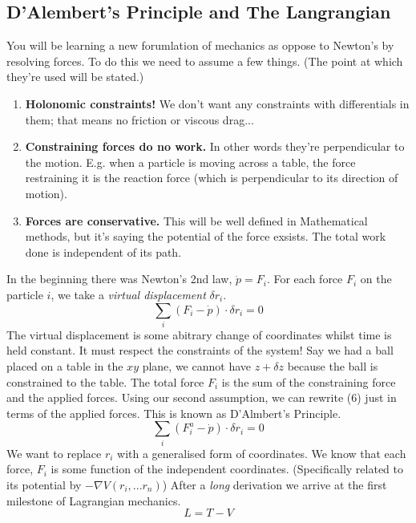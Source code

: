 \subsection{D'Alembert's Principle and The Langrangian}
You will be learning a new forumlation of mechanics as oppose to Newton's by resolving forces. To do this we need to assume a few things. (The point at which they're used will be stated.)
\begin{enumerate}
\item \textbf{Holonomic constraints!} We don't want any constraints with differentials in them; that means no friction or viscous drag...
\item \textbf{Constraining forces do no work.} In other words they're perpendicular to the motion. E.g. when a particle is moving across a table, the force restraining it is the reaction force (which is perpendicular to its direction of motion).
\item \textbf{Forces are conservative.} This will be well defined in Mathematical methods, but it's saying the potential of the force exsists. The total work done is independent of its path.
\end{enumerate}
\par 
In the beginning there was Newton's 2nd law, $\dot{p} = F_{i}$. For each force $F_{i}$ on the particle $i$, we take a \textit{virtual displacement} $\delta r_{i}$. 
\begin{equation}
\sum_{i} (F_{i} - \dot{p}) \cdot \delta r_{i} = 0
\end{equation}
The virtual displacement is some abitrary change of coordinates whilst time is held constant. It must respect the constraints of the system! Say we had a ball placed on a table in the $xy$ plane, we cannot have $z + \delta z$ because the ball is constrained to the table. The total force $F_{i}$ is the sum of the constraining force and the applied forces. Using our second assumption, we can rewrite (6) just in terms of the applied forces. This is known as D'Almbert's Principle.
\begin{equation}
\sum_{i} (F_{i}^{a} - \dot{p}) \cdot \delta r_{i} = 0
\end{equation}
We want to replace $r_{i}$ with a generalised form of coordinates. We know that each force, $F_{i}$ is some function of the independent coordinates. (Specifically related to its potential by $-\nabla V(r_{i}, ... r_{n})$)
After a \textit{long} derivation we arrive at the first milestone of Lagrangian mechanics. 
\begin{equation}
L = T - V
\end{equation}
